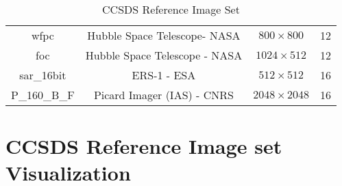 \begin{table}[h]
\begin{adjustbox}{max width=\textwidth}
\begin{tabular}{@{}cccc@{}}
wfpc                      & Hubble Space Telescope- NASA      & $800\times 800$             & 12                         \\
foc                       & Hubble Space Telescope - NASA     & $1024\times 512$            & 12                         \\
sar\_16bit                & ERS-1 - ESA                       & $512\times 512$             & 16                         \\
P\_160\_B\_F              & Picard Imager (IAS) - CNRS        & $2048\times 2048$           & 16                         \\ \bottomrule
\end{tabular}
\end{adjustbox}
\caption{CCSDS Reference Image Set}
\label{tab:refimgset}
\end{table}

\section{CCSDS Reference Image set Visualization}

